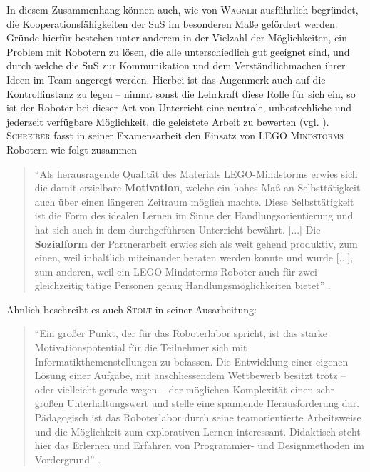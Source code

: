 \documentclass[paper=a4, DIV=calc, BCOR=12mm, twoside=on, onecolumn=on, open = right, titlepage =on, parskip =half-, headsepline = on, footsepline = off, chapterprefix = off, appendixprefix = on, fontsize = 12pt, numbers = noenddot, abstract = on]{scrbook}
\begin{document}
In diesem Zusammenhang können auch, wie von \textsc{Wagner} ausführlich begründet, die Kooperationsfähigkeiten der SuS im besonderen Maße gefördert werden. Gründe hierfür bestehen unter anderem in der Vielzahl der Möglichkeiten, ein Problem mit Robotern zu lösen, die alle unterschiedlich gut geeignet sind, und durch welche die SuS zur Kommunikation und dem Verständlichmachen ihrer Ideen im Team angeregt werden. Hierbei ist das Augenmerk auch auf die Kontrollinstanz zu legen -- nimmt sonst die Lehrkraft diese Rolle für sich ein, so ist der Roboter bei dieser Art von Unterricht eine neutrale, unbestechliche und jederzeit verfügbare Möglichkeit, die geleistete Arbeit zu bewerten (vgl. \cite[S.6f.]{wagner:05}).\\

\textsc{Schreiber} fasst in seiner Examensarbeit den Einsatz von \textsc{LEGO Mindstorms} Robotern wie folgt zusammen
\begin{quote}
"`Als herausragende Qualität des Materials LEGO-Mindstorms erwies sich die damit erzielbare \textbf{Motivation}, welche ein hohes Maß an Selbsttätigkeit auch über einen längeren Zeitraum möglich machte. Diese Selbsttätigkeit ist die Form des idealen Lernen im Sinne der Handlungsorientierung und hat sich auch in dem durchgeführten Unterricht bewährt. [...] Die \textbf{Sozialform} der Partnerarbeit erwies sich als weit gehend produktiv, zum einen, weil inhaltlich miteinander beraten werden konnte und wurde [...], zum anderen, weil ein LEGO-Mindstorms-Roboter auch für zwei gleichzeitig tätige Personen genug Handlungsmöglichkeiten bietet"' \cite[S.47f.]{schreiber:04}.
\end{quote}

Ähnlich beschreibt es auch \textsc{Stolt} in seiner Ausarbeitung:
\begin{quote}
"`Ein großer Punkt, der für das Roboterlabor spricht, ist das starke Motivationspotential für die Teilnehmer sich mit Informatikthemenstellungen zu befassen. Die Entwicklung einer eigenen Lösung einer Aufgabe, mit anschliessendem Wettbewerb besitzt trotz – oder vielleicht gerade wegen – der möglichen Komplexität einen sehr großen Unterhaltungswert und stelle eine spannende Herausforderung dar. Pädagogisch ist das Roboterlabor durch seine teamorientierte Arbeitsweise und die Möglichkeit zum explorativen Lernen interessant. Didaktisch steht hier das Erlernen und Erfahren von Programmier- und Designmethoden im Vordergrund"' \cite[S.5f.]{stolt:01}.
\end{quote}
\end{document}
